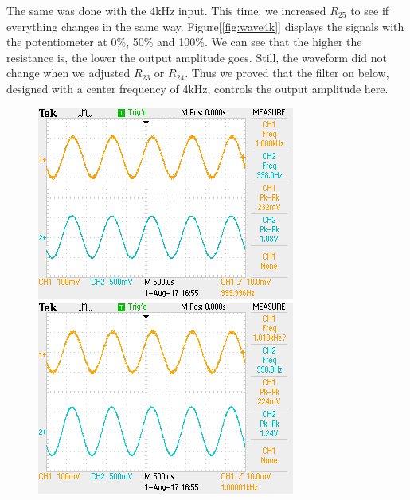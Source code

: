 \newline
\phantom{ } The same was done with the 4kHz input. This time, we increased $R_{25}$ to see if everything changes in the same way. Figure[\ref{fig:wave4k}] displays the signals with the potentiometer at 0\%, 50\% and 100\%. We can see that the higher the resistance is, the lower the output amplitude goes. Still, the waveform did not change when we adjusted $R_{23}$ or $R_{24}$. Thus we proved that the filter on below, designed with a center frequency of 4kHz, controls the output amplitude here.

\begin{figure}[!htbp]
	\centering
	\begin{framed}
		\includegraphics[width=\linewidth]{images/TEK0003.png}
		\includegraphics[width=\linewidth]{images/TEK0004.png}

\end{framed}
\end{figure}
